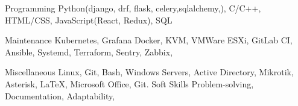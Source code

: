 

\begin{cvskills}

  \cvskill
    {Programming}
    {Python(django, drf, flask, celery,sqlalchemy,), C/C++, HTML/CSS, JavaScript(React, Redux), SQL} %

  \cvskill
    {Maintenance}
    {Kubernetes, Grafana Docker, KVM, VMWare ESXi, GitLab CI, Ansible, Systemd, Terraform, Sentry, Zabbix, } %

  \cvskill
    {Miscellaneous} %
    {Linux, Git, Bash, Windows Servers, Active Directory, Mikrotik, Asterisk, \LaTeX, Microsoft Office, Git.} %
  \cvskill
    {Soft Skills} %
    {Problem-solving, Documentation, Adaptability, } %

\end{cvskills}
